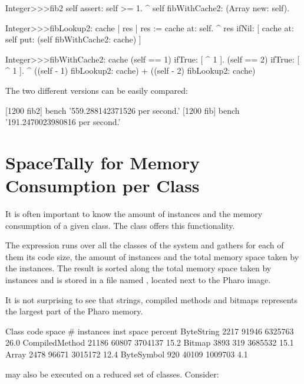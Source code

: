 \documentclass[a4paper,10pt,twoside]{book}
\begin{document}
\begin{code}{}
Integer>>>fib2
	self assert: self >= 1.
	^ self fibWithCache2: (Array new: self).

Integer>>>fibLookup2: cache
	| res |
	res := cache at: self.
	^ res ifNil: [ cache at: self put: (self fibWithCache2: cache) ]
		
Integer>>>fibWithCache2: cache
 	(self == 1) ifTrue: [ ^ 1 ].
 	(self == 2) ifTrue: [ ^ 1 ].
 	^ ((self - 1) fibLookup2: cache) + ((self - 2) fibLookup2: cache)
\end{code}

The two different versions can be easily compared:

\begin{code}{}
[1200 fib2] bench  '559.288142371526 per second.'
[1200 fib] bench  '191.2470023980816 per second.'
\end{code}


\section{SpaceTally for Memory Consumption per Class}

It is often important to know the amount of instances and the memory consumption of a given class. The class  offers this functionality. 

The expression  runs over all the classes of the system and gathers for each of them its code size, the amount of instances and the total memory space taken by the instances. The result is sorted along the total memory space taken by instances and is stored in a file named , located next to the Pharo image.

It is not surprising to see that strings, compiled methods and bitmaps represents the largest part of the Pharo memory.

\begin{code}{}
Class                           code space # instances  inst space percent
ByteString                           2217       91946       6325763    26.0
CompiledMethod               21186       60807       3704137    15.2
Bitmap                                  3893         319       3685532    15.1
Array                                     2478       96671       3015172    12.4
ByteSymbol                        920       40109       1009703     4.1
\end{code}

 may also be executed on a reduced set of classes. Consider:
\end{document}
